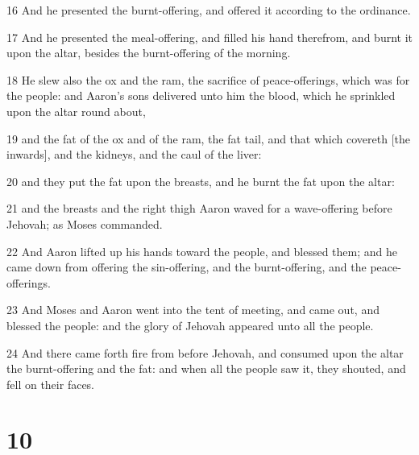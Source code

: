 \par 16 And he presented the burnt-offering, and offered it according to the ordinance.
\par 17 And he presented the meal-offering, and filled his hand therefrom, and burnt it upon the altar, besides the burnt-offering of the morning.
\par 18 He slew also the ox and the ram, the sacrifice of peace-offerings, which was for the people: and Aaron's sons delivered unto him the blood, which he sprinkled upon the altar round about,
\par 19 and the fat of the ox and of the ram, the fat tail, and that which covereth [the inwards], and the kidneys, and the caul of the liver:
\par 20 and they put the fat upon the breasts, and he burnt the fat upon the altar:
\par 21 and the breasts and the right thigh Aaron waved for a wave-offering before Jehovah; as Moses commanded.
\par 22 And Aaron lifted up his hands toward the people, and blessed them; and he came down from offering the sin-offering, and the burnt-offering, and the peace-offerings.
\par 23 And Moses and Aaron went into the tent of meeting, and came out, and blessed the people: and the glory of Jehovah appeared unto all the people.
\par 24 And there came forth fire from before Jehovah, and consumed upon the altar the burnt-offering and the fat: and when all the people saw it, they shouted, and fell on their faces.

\chapter{10}

